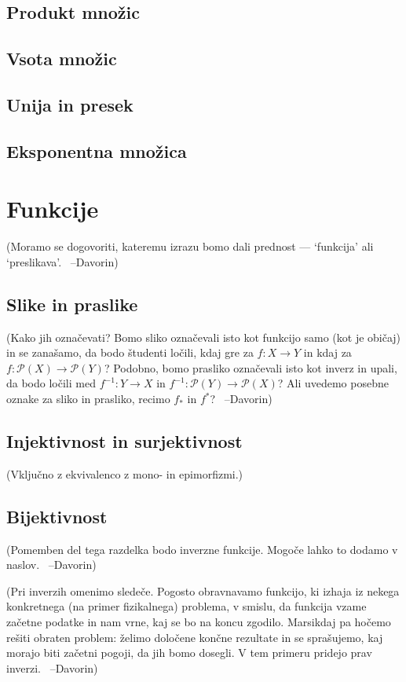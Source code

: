 \documentclass[11pt,a4paper,twoside]{book}
\newcommand{\davorin}[1]{{\small\textcolor{davorincolor}{(#1 \ \mbox{--Davorin})}}}
\newcommand{\note}[1]{{\small\textcolor{notecolor}{(#1)}}}
\newcommand{\pst}{\mathcal{P}}
\begin{document}
		\section{Produkt množic}
		\section{Vsota množic}
		\section{Unija in presek}
		\section{Eksponentna množica}
	
	\chapter{Funkcije}
		\davorin{Moramo se dogovoriti, kateremu izrazu bomo dali prednost --- `funkcija' ali `preslikava'.}
		\section{Slike in praslike}
			\davorin{Kako jih označevati? Bomo sliko označevali isto kot funkcijo samo (kot je običaj) in se zanašamo, da bodo študenti ločili, kdaj gre za $f\colon X \to Y$ in kdaj za $f\colon \pst(X) \to \pst(Y)$? Podobno, bomo prasliko označevali isto kot inverz in upali, da bodo ločili med $f^{-1}\colon Y \to X$ in $f^{-1}\colon \pst(Y) \to \pst(X)$? Ali uvedemo posebne oznake za sliko in prasliko, recimo $f_*$ in $f^*$?}
		\section{Injektivnost in surjektivnost}
			\note{Vključno z ekvivalenco z mono- in epimorfizmi.}
		\section{Bijektivnost}
			\davorin{Pomemben del tega razdelka bodo inverzne funkcije. Mogoče lahko to dodamo v naslov.}
			
			\davorin{Pri inverzih omenimo sledeče. Pogosto obravnavamo funkcijo, ki izhaja iz nekega konkretnega (na primer fizikalnega) problema, v smislu, da funkcija vzame začetne podatke in nam vrne, kaj se bo na koncu zgodilo. Marsikdaj pa hočemo rešiti obraten problem: želimo določene končne rezultate in se sprašujemo, kaj morajo biti začetni pogoji, da jih bomo dosegli. V tem primeru pridejo prav inverzi.}
	
\end{document}
